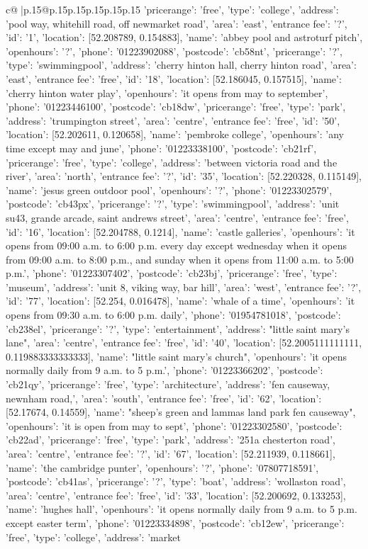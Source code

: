 \documentclass{article}
\begin{document}
{\begin{supertabular}{c@{$\;$}|p{.15\linewidth}@{}p{.15\linewidth}p{.15\linewidth}p{.15\linewidth}p{.15\linewidth}p{.15\linewidth}}
{{{'pricerange': 'free', 'type': 'college'}, {'address': 'pool way, whitehill road, off newmarket road', 'area': 'east', 'entrance fee': '?', 'id': '1', 'location': [52.208789, 0.154883], 'name': 'abbey pool and astroturf pitch', 'openhours': '?', 'phone': '01223902088', 'postcode': 'cb58nt', 'pricerange': '?', 'type': 'swimmingpool'}, {'address': 'cherry hinton hall, cherry hinton road', 'area': 'east', 'entrance fee': 'free', 'id': '18', 'location': [52.186045, 0.157515], 'name': 'cherry hinton water play', 'openhours': 'it opens from may to september', 'phone': '01223446100', 'postcode': 'cb18dw', 'pricerange': 'free', 'type': 'park'}, {'address': 'trumpington street', 'area': 'centre', 'entrance fee': 'free', 'id': '50', 'location': [52.202611, 0.120658], 'name': 'pembroke college', 'openhours': 'any time except may and june', 'phone': '01223338100', 'postcode': 'cb21rf', 'pricerange': 'free', 'type': 'college'}, {'address': 'between victoria road and the river', 'area': 'north', 'entrance fee': '?', 'id': '35', 'location': [52.220328, 0.115149], 'name': 'jesus green outdoor pool', 'openhours': '?', 'phone': '01223302579', 'postcode': 'cb43px', 'pricerange': '?', 'type': 'swimmingpool'}, {'address': 'unit su43, grande arcade, saint andrews street', 'area': 'centre', 'entrance fee': 'free', 'id': '16', 'location': [52.204788, 0.1214], 'name': 'castle galleries', 'openhours': 'it opens from 09:00 a.m. to 6:00 p.m. every day except wednesday when it opens from 09:00 a.m. to 8:00 p.m., and sunday when it opens from 11:00 a.m. to 5:00 p.m.', 'phone': '01223307402', 'postcode': 'cb23bj', 'pricerange': 'free', 'type': 'museum'}, {'address': 'unit 8, viking way, bar hill', 'area': 'west', 'entrance fee': '?', 'id': '77', 'location': [52.254, 0.016478], 'name': 'whale of a time', 'openhours': 'it opens from 09:30 a.m. to 6:00 p.m. daily', 'phone': '01954781018', 'postcode': 'cb238el', 'pricerange': '?', 'type': 'entertainment'}, {'address': "little saint mary's lane", 'area': 'centre', 'entrance fee': 'free', 'id': '40', 'location': [52.2005111111111, 0.119883333333333], 'name': "little saint mary's church", 'openhours': 'it opens normally daily from 9 a.m. to 5 p.m.', 'phone': '01223366202', 'postcode': 'cb21qy', 'pricerange': 'free', 'type': 'architecture'}, {'address': 'fen causeway, newnham road,', 'area': 'south', 'entrance fee': 'free', 'id': '62', 'location': [52.17674, 0.14559], 'name': "sheep's green and lammas land park fen causeway", 'openhours': 'it is open from may to sept', 'phone': '01223302580', 'postcode': 'cb22ad', 'pricerange': 'free', 'type': 'park'}, {'address': '251a chesterton road', 'area': 'centre', 'entrance fee': '?', 'id': '67', 'location': [52.211939, 0.118661], 'name': 'the cambridge punter', 'openhours': '?', 'phone': '07807718591', 'postcode': 'cb41as', 'pricerange': '?', 'type': 'boat'}, {'address': 'wollaston road', 'area': 'centre', 'entrance fee': 'free', 'id': '33', 'location': [52.200692, 0.133253], 'name': 'hughes hall', 'openhours': 'it opens normally daily from 9 a.m. to 5 p.m. except easter term', 'phone': '01223334898', 'postcode': 'cb12ew', 'pricerange': 'free', 'type': 'college'}, {'address': 'market }}}
\end{supertabular}}
\end{document}
